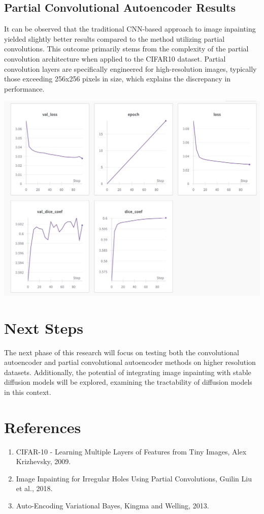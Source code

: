 \documentclass[12pt,a4paper]{article}
\begin{document}
\subsection{Partial Convolutional Autoencoder Results}
It can be observed that the traditional CNN-based approach to image inpainting yielded slightly better results compared to the method utilizing partial convolutions. This outcome primarily stems from the complexity of the partial convolution architecture when applied to the CIFAR10 dataset. Partial convolution layers are specifically engineered for high-resolution images, typically those exceeding 256x256 pixels in size, which explains the discrepancy in performance.

\begin{center}
	\includegraphics[scale=0.4]{results2.jpg}
\end{center}

\section{Next Steps}
The next phase of this research will focus on testing both the convolutional autoencoder and partial convolutional autoencoder methods on higher resolution datasets. Additionally, the potential of integrating image inpainting with stable diffusion models will be explored, examining the tractability of diffusion models in this context.

\section*{References}
\begin{enumerate}
    \item CIFAR-10 - Learning Multiple Layers of Features from Tiny Images, Alex Krizhevsky, 2009.
    \item Image Inpainting for Irregular Holes Using Partial Convolutions, Guilin Liu et al., 2018.
    \item Auto-Encoding Variational Bayes, Kingma and Welling, 2013.
\end{enumerate}
\end{document}

